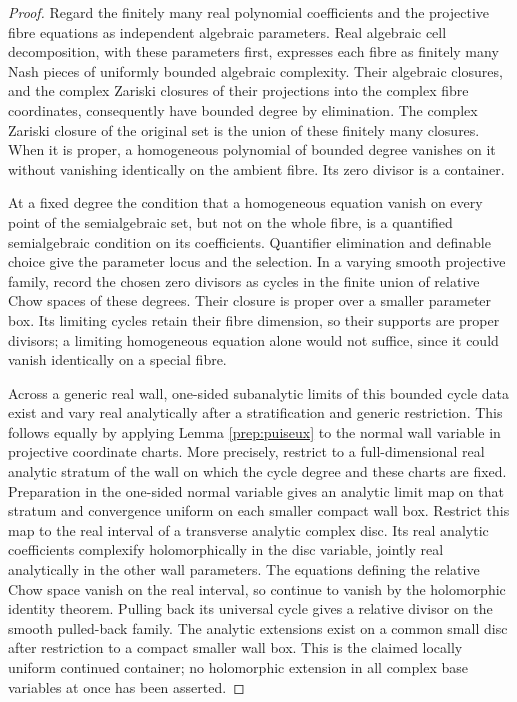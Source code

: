 \begin{proof}
Regard the finitely many real polynomial coefficients and the
projective fibre equations as independent algebraic parameters.
Real algebraic cell decomposition, with these parameters first,
expresses each fibre as finitely many Nash pieces of uniformly
bounded algebraic complexity. Their algebraic closures, and the
complex Zariski closures of their projections into the complex
fibre coordinates, consequently have bounded degree by elimination.
The complex Zariski closure of the original set is the union of
these finitely many closures. When it is proper, a homogeneous
polynomial of bounded degree vanishes on it without vanishing
identically on the ambient fibre. Its zero divisor is a container.

At a fixed degree the condition that a homogeneous equation
vanish on every point of the semialgebraic set, but not on the
whole fibre, is a quantified semialgebraic condition on its
coefficients. Quantifier elimination and definable choice give
the parameter locus and the selection. In a varying smooth
projective family, record the chosen zero divisors as cycles in
the finite union of relative Chow spaces of these degrees.
Their closure is proper over a smaller parameter box. Its
limiting cycles retain their fibre dimension, so their supports
are proper divisors; a limiting homogeneous equation alone would
not suffice, since it could vanish identically on a special fibre.

Across a generic real wall, one-sided subanalytic limits of this
bounded cycle data exist and vary real analytically after a
stratification and generic restriction. This follows equally by
applying Lemma \ref{prep:puiseux} to the normal wall variable in
projective coordinate charts. More precisely, restrict to a
full-dimensional real analytic stratum of the wall on which the
cycle degree and these charts are fixed. Preparation in the
one-sided normal variable gives an analytic limit map on that
stratum and convergence uniform on each smaller compact wall
box. Restrict this map to the real interval of a transverse
analytic complex disc. Its real analytic coefficients complexify
holomorphically in the disc variable, jointly real analytically
in the other wall parameters. The equations defining the relative
Chow space vanish on the real interval, so continue to vanish by
the holomorphic identity theorem. Pulling back its universal cycle
gives a relative divisor on the smooth pulled-back family.
The analytic extensions exist on a common small disc after
restriction to a compact smaller wall box. This is the claimed
locally uniform continued container; no holomorphic extension in
all complex base variables at once has been asserted.
\end{proof}

